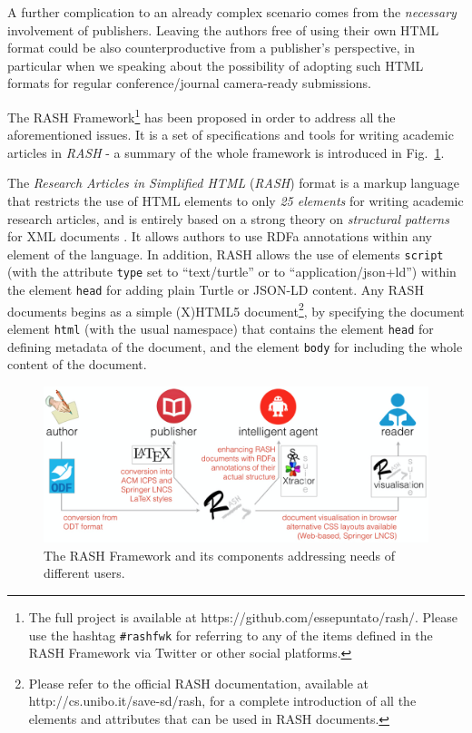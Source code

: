 \documentclass[runningheads,a4paper]{llncs}
\makeatletter
\def\maxwidth#1{\ifdim\Gin@nat@width>#1 #1\else\Gin@nat@width\fi}
\makeatother
\begin{document}
A further complication to an already complex scenario comes from the {\em necessary} involvement of publishers. Leaving the authors free of using their own HTML format could be also counterproductive from a publisher's perspective, in particular when we speaking about the possibility of adopting such HTML formats for regular conference/journal camera-ready submissions.

The RASH Framework\footnote{The full project is available at https://github.com/essepuntato/rash/. Please use the hashtag \verb+#rashfwk+ for referring to any of the items defined in the RASH Framework via Twitter or other social platforms.} has been proposed in order to address all the aforementioned issues. It is a set of specifications and tools for writing academic articles in {\em RASH} - a summary of the whole framework is introduced in Fig.~\ref{fig_framework}.

The {\em Research Articles in Simplified HTML} ({\em RASH}) format is a markup language that restricts the use of HTML elements to only {\em 25 elements} for writing academic research articles, and is entirely based on a strong theory on {\em structural patterns} for XML documents  \cite{patterns}. It allows authors to use RDFa annotations within any element of the language. In addition, RASH allows the use of elements \verb+script+ (with the attribute \verb+type+ set to ``text/turtle'' or to ``application/json+ld'') within the element \verb+head+ for adding plain Turtle or JSON-LD content. Any RASH documents begins as a simple (X)HTML5 document\footnote{Please refer to the official RASH documentation, available at http://cs.unibo.it/save-sd/rash, for a complete introduction of all the elements and attributes that can be used in RASH documents.}, by specifying the document element \verb+html+ (with the usual namespace) that contains the element \verb+head+ for defining metadata of the document, and the element \verb+body+ for including the whole content of the document.
\begin{figure}[h!]
\centering
\includegraphics[width=\maxwidth{\textwidth}]{img/rash-demo-iswc2015-framework.png}
\caption{The RASH Framework and its components addressing needs of different users.}
\label{fig_framework}
\end{figure}
\end{document}
